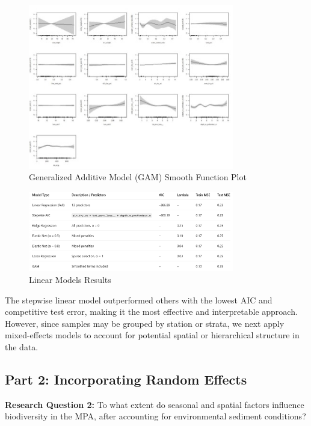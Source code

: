 \documentclass[12pt]{article}
\begin{document}
\begin{figure}[h!]
\centering
\includegraphics[width=0.8\textwidth]{GAM-smooth-function-plot.jpg}
\caption{Generalized Additive Model (GAM) Smooth Function Plot}
\label{fig:gam-smooth}
\end{figure}

\begin{figure}[h!]
\centering
\includegraphics[width=0.8\textwidth]{linear-models.png}
\caption{Linear Models Results}
\label{fig:linear-models}
\end{figure}

\qquad The stepwise linear model outperformed others with the lowest AIC and competitive test error, making it the most effective and interpretable approach. However, since samples may be grouped by station or strata, we next apply mixed-effects models to account for potential spatial or hierarchical structure in the data.

\subsection{Part 2: Incorporating Random Effects}

\textbf{Research Question 2: } To what extent do seasonal and spatial factors influence biodiversity in the MPA, after accounting for environmental sediment conditions?
\end{document}
